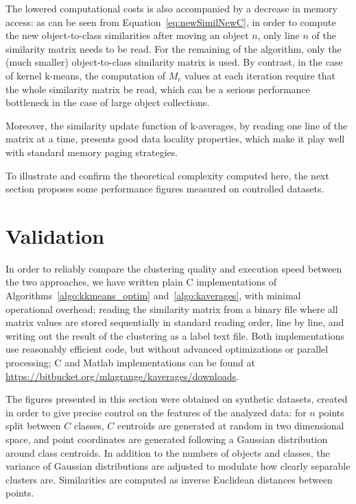 \documentclass[natbib,smallextended]{svjour3}
\begin{document}
The lowered computational costs is also accompanied by a decrease in memory access: as can be seen from Equation~\ref{eq:newSimilNewC}, in order to compute the new object-to-class similarities after moving an object $n$, only line $n$ of the similarity matrix needs to be read. For the remaining of the algorithm, only the (much smaller) object-to-class similarity matrix is used. By contrast, in the case of kernel k-means, the computation of $M_c$ values at each iteration require that the whole similarity matrix be read, which can be a serious performance bottleneck in the case of large object collections.

Moreover, the similarity update function of k-averages, by reading one line of the matrix at a time, presents good data locality properties, which make it play well with standard memory paging strategies.

To illustrate and confirm the theoretical complexity computed here, the next section proposes some performance figures measured on controlled datasets.

\section{Validation}
\label{sec:validation}

In order to reliably compare the clustering quality and execution speed between the two approaches, we have written plain C implementations of Algorithms~\ref{algo:kkmeans_optim} and~\ref{algo:kaverages}, with minimal operational overhead: reading the similarity matrix from a binary file where all matrix values are stored sequentially in standard reading order, line by line, and writing out the result of the clustering as a label text file. Both implementations use reasonably efficient code, but without advanced optimizations or parallel processing; C and Matlab implementations can be found at\\ \url{https://bitbucket.org/mlagrange/kaverages/downloads}.	%

The figures presented in this section were obtained on synthetic datasets, created in order to give precise control on the features of the analyzed data: for $n$ points split between $C$ classes, $C$ centroids are generated at random in two dimensional space, and point coordinates are generated following a Gaussian distribution around class centroids. In addition to the numbers of objects and classes, the variance of Gaussian distributions are adjusted to modulate how clearly separable clusters are. Similarities are computed as inverse Euclidean distances between points. %
\end{document}
